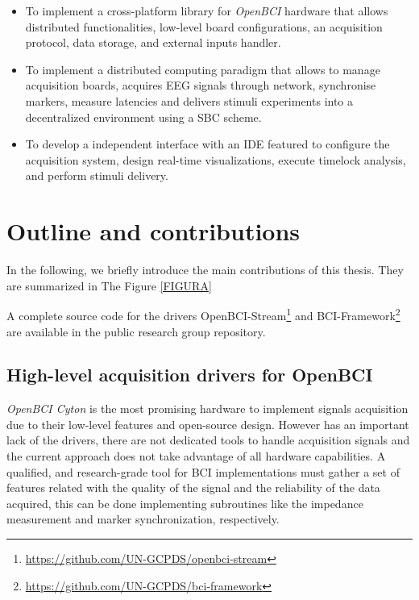     \begin{itemize}

        \item To implement a cross-platform library for \textit{OpenBCI} hardware that allows distributed functionalities, low-level board configurations, an acquisition protocol, data storage, and external inputs handler. %
        
        \item To implement a distributed computing paradigm that allows to manage acquisition boards, acquires \gls*{EEG} signals through network, synchronise markers, measure latencies and delivers stimuli experiments into a decentralized environment using a \gls*{SBC} scheme.

        \item To develop a independent interface with an \gls*{IDE} featured to configure the acquisition system, design real-time visualizations, execute timelock analysis, and perform stimuli delivery. 


    \end{itemize}


\section{Outline and contributions}

{\color {blue}
In the following, we briefly introduce the main contributions of this thesis. They are summarized in The Figure \ref{FIGURA}

A complete source code for the drivers OpenBCI-Stream\footnote{\href{https://github.com/UN-GCPDS/openbci-stream}{https://github.com/UN-GCPDS/openbci-stream}} and BCI-Framework\footnote{\href{https://github.com/UN-GCPDS/bci-framework}{https://github.com/UN-GCPDS/bci-framework}} are available in the public research group repository.
}

\subsection{High-level acquisition drivers for OpenBCI}

\textit{OpenBCI Cyton} is the most promising hardware to implement signals acquisition due to their low-level features and open-source design. However has an important lack of the drivers, there are not dedicated tools to handle acquisition signals and the current approach does not take advantage of all hardware capabilities. A qualified, and research-grade tool for \gls*{BCI} implementations must gather a set of features related with the quality of the signal and the reliability of the data acquired, this can be done implementing subroutines like the impedance measurement and marker synchronization, respectively.

